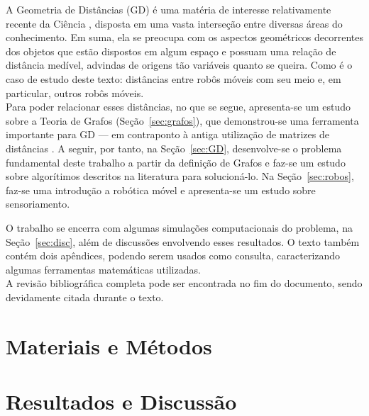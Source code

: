 \documentclass[a4paper,12pt]{report}
\begin{document}
	A Geometria de Distâncias (GD) é uma matéria de interesse relativamente recente da Ciência \cite{carlileGDandAplications}, disposta em uma vasta interseção entre diversas áreas do conhecimento. Em suma, ela se preocupa com os aspectos geométricos decorrentes dos objetos que estão dispostos em algum espaço e possuam uma relação de distância medível, advindas de origens tão variáveis quanto se queira. Como é o caso de estudo deste texto: distâncias entre robôs móveis com seu meio e, em particular, outros robôs móveis.
	\\
	
	Para poder relacionar esses distâncias, no que se segue, apresenta-se um estudo sobre a Teoria de Grafos (Seção~\ref{sec:grafos}), que demonstrou-se uma ferramenta importante para GD --- em contraponto à antiga utilização de matrizes de distâncias \cite{carlileGDandAplications}. A seguir, por tanto, na Seção~\ref{sec:GD}, desenvolve-se o problema fundamental deste trabalho a partir da definição de Grafos e faz-se um estudo sobre algorítimos descritos na literatura para solucioná-lo. Na Seção~\ref{sec:robos}, faz-se uma introdução a robótica móvel e apresenta-se um estudo sobre sensoriamento. 
	
	O trabalho se encerra com algumas simulações computacionais do problema, na Seção~\ref{sec:disc}, além de discussões envolvendo esses resultados. O texto também contém dois apêndices, podendo serem usados como consulta, caracterizando algumas ferramentas matemáticas utilizadas. 
	\\
	
	A revisão bibliográfica completa pode ser encontrada no fim do documento, sendo devidamente citada durante o texto. 
	
	\newpage
	
	\chapter{Materiais e Métodos}
	
	
	
	\newpage
	
	

	\newpage
	\chapter{Resultados e Discussão \label{sec:disc}}
	
	
	
\end{document}
